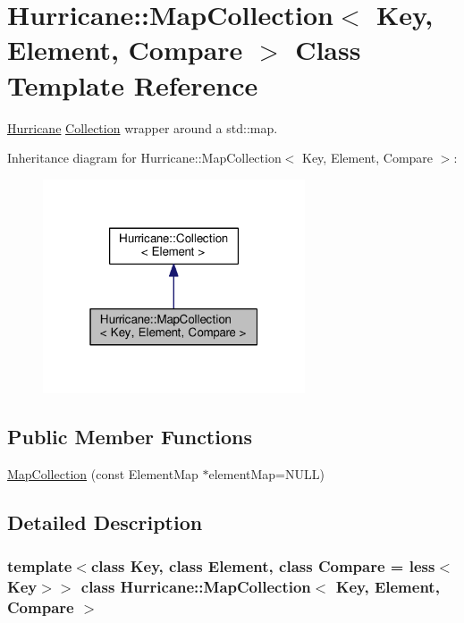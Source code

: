 \hypertarget{classHurricane_1_1MapCollection}{}\section{Hurricane\+:\+:Map\+Collection$<$ Key, Element, Compare $>$ Class Template Reference}
\label{classHurricane_1_1MapCollection}


\hyperlink{namespaceHurricane}{Hurricane} \hyperlink{classHurricane_1_1Collection}{Collection} wrapper around a std\+::map.  




Inheritance diagram for Hurricane\+:\+:Map\+Collection$<$ Key, Element, Compare $>$\+:\nopagebreak
\begin{figure}[H]
\begin{center}
\leavevmode
\includegraphics[width=220pt]{classHurricane_1_1MapCollection__inherit__graph}
\end{center}
\end{figure}
\subsection*{Public Member Functions}
\begin{DoxyCompactItemize}
\item 
\hyperlink{classHurricane_1_1MapCollection_a0b905fb46ced35815132e5eab62a8de1}{Map\+Collection} (const Element\+Map $\ast$element\+Map=N\+U\+LL)
\end{DoxyCompactItemize}


\subsection{Detailed Description}
\subsubsection*{template$<$class Key, class Element, class Compare = less$<$\+Key$>$$>$\newline
class Hurricane\+::\+Map\+Collection$<$ Key, Element, Compare $>$}

